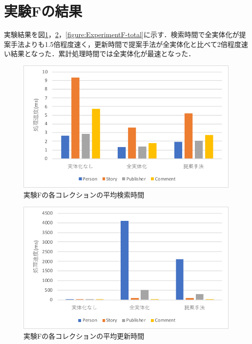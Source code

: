 \documentclass[a4paper,11pt]{ujreport}
\begin{document}
\section{実験Fの結果}
実験結果を図\ref{figure:ExperimentF-find}，\ref{figure:ExperimentF-update}，\ref{figure:ExperimentF-total}に示す．検索時間で全実体化が提案手法よりも1.5倍程度速く，更新時間で提案手法が全実体化と比べて2倍程度速い結果となった．累計処理時間では全実体化が最速となった．
\begin{figure}[htbp]
	\begin{center}
		\includegraphics[width=30em]{src/ExperimentF-find.pdf} %
	\end{center}
	\caption{実験Fの各コレクションの平均検索時間}
	\label{figure:ExperimentF-find}
\end{figure}
\begin{figure}[htbp]
	\begin{center}
		\includegraphics[width=30em]{src/ExperimentF-update.pdf} %
	\end{center}
	\caption{実験Fの各コレクションの平均更新時間}
	\label{figure:ExperimentF-update}
\end{figure}
\end{document}
